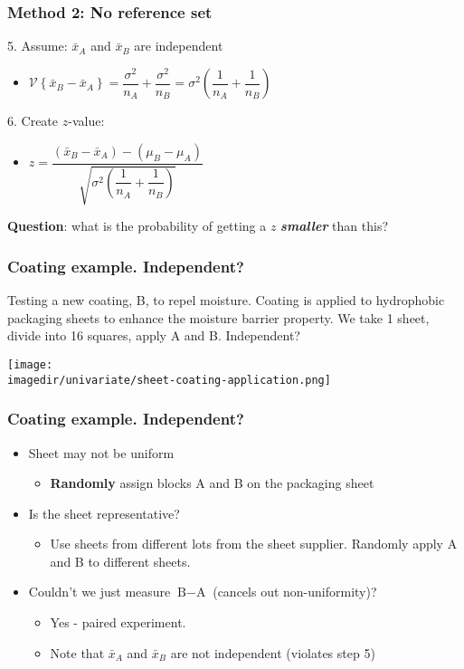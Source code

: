 \begin{frame}\frametitle{Method 2: No reference set}

	5. Assume: $\bar{x}_A$ and $\bar{x}_B$ are independent
	\begin{itemize}
		\item	$\mathcal{V}\left\{\bar{x}_B - \bar{x}_A\right\} = \dfrac{\sigma^2}{n_A} + \dfrac{\sigma^2}{n_B} = \sigma^2 \left(\dfrac{1}{n_A} + \dfrac{1}{n_B}\right)$
	\end{itemize}

	6. Create $z$-value:
	\begin{itemize}
		\item	$z = \dfrac{(\bar{x}_B - \bar{x}_A) - (\mu_B - \mu_A)}{\sqrt{\sigma^2 \left(\dfrac{1}{n_A} + \dfrac{1}{n_B}\right)}}$
	\end{itemize}

	\textbf{Question}: what is the probability of getting a $z$ \textbf{\emph{smaller}} than this?
\end{frame}

\begin{frame}\frametitle{Coating example. Independent?}

	Testing a new coating, B, to repel moisture. Coating is applied to hydrophobic packaging sheets to enhance the moisture barrier property. We take 1 sheet, divide into 16 squares, apply A and B. Independent?
	\begin{center}
		\texttt{[image: \\imagedir/univariate/sheet-coating-application.png]}
	\end{center}
\end{frame}

\begin{frame}\frametitle{Coating example. Independent?}
	\begin{itemize}
		\item	Sheet may not be uniform
		\begin{itemize}
			\item	\textbf{Randomly} assign blocks A and B on the packaging sheet 
		\end{itemize}
		\item	Is the sheet representative?
		\begin{itemize}
			\item	Use sheets from different lots from the sheet supplier. Randomly apply A and B to different sheets.
		\end{itemize}
		\item	Couldn't we just measure $\text{B} - \text{A}$ (cancels out non-uniformity)?
		\begin{itemize}
			\item	Yes - paired experiment.
			\item	Note that $\bar{x}_A$ and $\bar{x}_B$ are not independent (violates step 5)
		\end{itemize}
	\end{itemize}
\end{frame}

